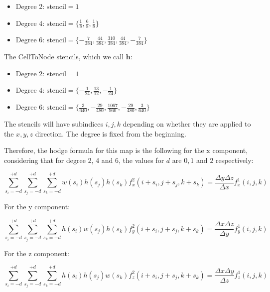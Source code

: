 \documentclass[11pt]{article}
\begin{document}
\begin{itemize}
    \item Degree 2: $\text{stencil} = 1$
    \item Degree 4: $\text{stencil} = \{ \frac{1}{8}, \frac{6}{8}, \frac{1}{8} \}$ 
    \item Degree 6: $\text{stencil} = \{ -\frac{7}{384}, \frac{44}{384}, \frac{310}{384}, \frac{44}{384}, -\frac{7}{384} \}$ 
\end{itemize}

The CellToNode stencils, which we call $\mathbf{h}$: 

\begin{itemize}
    \item Degree 2: $\text{stencil} = 1$
    \item Degree 4: $\text{stencil} = \{ -\frac{1}{24}, \frac{13}{12}, -\frac{1}{24} \}$ 
    \item Degree 6: $\text{stencil} = \{ \frac{3}{640}, -\frac{29}{480}, \frac{1067}{960}, -\frac{29}{480}, \frac{3}{640} \}$ 
\end{itemize}

The stencils will have subindices $i,j,k$ depending on whether they are applied to the $x, y, z$ direction. The degree is fixed from the beginning.
\linebreak

Therefore, the hodge formula for this map is the following for the x component, considering that for degree 2, 4 and 6, the values for $d$ are $0, 1$ and $2$ respectively:

\begin{equation}
    \sum_{s_i = -d} ^ {+d} \sum_{s_j = -d} ^ {+d} \sum_{s_k = -d} ^ {+d} w(s_i)h(s_j)h(s_k) f_{x}^2 (i + s_i, j + s_j, k + s_k) = \frac{\Delta y \Delta z}{\Delta x} f_{x}^1 (i, j, k)
\end{equation}

For the y component:

\begin{equation}
    \sum_{s_i = -d} ^ {+d} \sum_{s_j = -d} ^ {+d} \sum_{s_k = -d} ^ {+d} h(s_i)w(s_j)h(s_k) f_{y}^2 (i + s_i, j + s_j, k + s_k) = \frac{\Delta x \Delta z}{\Delta y} f_{y}^1 (i, j, k)
\end{equation}

For the z component:

\begin{equation}
    \sum_{s_i = -d} ^ {+d} \sum_{s_j = -d} ^ {+d} \sum_{s_k = -d} ^ {+d} h(s_i)h(s_j)w(s_k) f_{z}^2 (i + s_i, j + s_j, k + s_k) = \frac{\Delta x \Delta y}{\Delta z} f_{z}^1 (i, j, k)
\end{equation}
\end{document}
